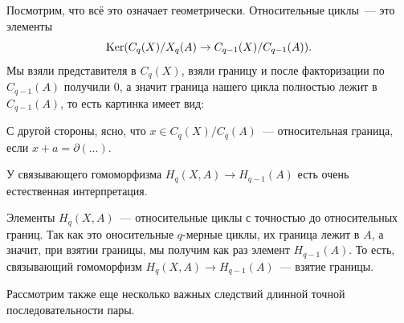     Посмотрим, что всё это означает геометрически. Относительные циклы~--- это элементы
    \[ \Ker\lr*{C_{q}(X)/X_{q}(A) \to C_{q - 1}(X)/C_{q - 1}(A)}. \]
    Мы взяли представителя в $C_{q}(X)$, взяли границу и после факторизации по $C_{q - 1}(A)$ получили 0,
    а значит граница нашего цикла полностью лежит в $C_{q - 1}(A)$, то есть картинка имеет вид:
    \begin{center}
    \end{center}
    С другой стороны, ясно, что $x \in C_{q}(X)/C_{q}(A)$~--- относительная граница, если $x + a = \partial(\ldots)$.

    \begin{remark}
        У связывающего гомоморфизма $H_{q}(X, A) \to H_{q - 1}(A)$ есть очень естественная интерпретация.

    Элементы $H_{q}(X, A)$~--- относительные циклы с точностью до относительных границ. Так как это оносительные $q$-мерные циклы,
    их граница лежит в  $A$, а значит, при взятии границы, мы получим как раз элемент $H_{q - 1}(A)$. То есть, связывающий гомоморфизм
    $H_{q}(X, A) \to H_{q - 1}(A)$~--- взятие границы.
    \end{remark}


    Рассмотрим также еще несколько важных следствий длинной точной последовательности пары. 

